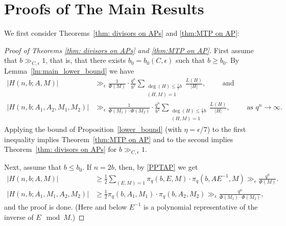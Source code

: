 \documentclass[12pt]{amsart}
\numberwithin{equation}{section}
\theoremstyle{definition}
\theoremstyle{remark}
\begin{document}
\section{Proofs of The Main Results}\label{sec:last}
We first consider Theorems~\ref{thm: divisors on APs} and \ref{thm:MTP on AP}:
\begin{proof}[Proof of Theorems \ref{thm: divisors on APs} and \ref{thm:MTP on AP}]
    First assume that $b\gg_{C,\epsilon} 1$, that is, that there exists $b_0=b_0(C,\epsilon)$ such that $b\geq b_0$. By Lemma~\ref{lm:main_lower_bound} we have
    \[
    \begin{split}
        |H(n,b;A,M)| &\gg_{\epsilon} \frac{1}{\Phi(M)} \cdot \frac{q^{n}}{b^2} \sum_{\substack{\deg(H)\leq \frac{\epsilon}{7} b \\ (H,M)=1}} \frac{L(H)}{|H|}, \qquad \mbox{ and }\\
        |H(n,b;A_1,A_2,M_1,M_2)| &\gg_{\epsilon} \frac{1}{\Phi(M_1)\cdot \Phi(M_2)} \cdot \frac{q^{n}}{b^2} \sum_{\substack{\deg(H)\leq \frac{\epsilon}{7} b \\ (H,M)=1}} \frac{L(H)}{|H|}, \qquad \mbox{ as } q^n\to\infty.
    \end{split}
    \]
    Applying the bound of Proposition~\ref{lower_bound} (with $\eta=\epsilon/7$) to the first inequality implies Theorem~\ref{thm:MTP on AP} and to the second implies Theorem~\ref{thm: divisors on APs} for $b\gg_{C,\epsilon}1$.

    Next, assume that $b \leq b_0$.
    If $n=2b$, then, by \eqref{PPTAP} we get
    \begin{align*}
        |H(n,b;A,M)| &\geq \frac{1}{2} \sum_{(E,M)=1} \pi_q(b,E,M) \cdot \pi_q(b,AE^{-1},M) 
        \gg_{\epsilon} \frac{q^n}{\Phi(M)}.
\\    
        |H(n,b;A_1,M_1,A_2,M_2)| &\geq \frac{1}{2} \pi_q(b,A_1,M_1) \cdot \pi_q(b,A_2,M_2) \gg_{\epsilon} \frac{q^n}{\Phi(M_1) \cdot \Phi(M_2)},
    \end{align*}
    and the proof is done. (Here and below $E^{-1}$ is a polynomial representative of the inverse of $E\mod M$.)
    

\end{proof}
\end{document}
